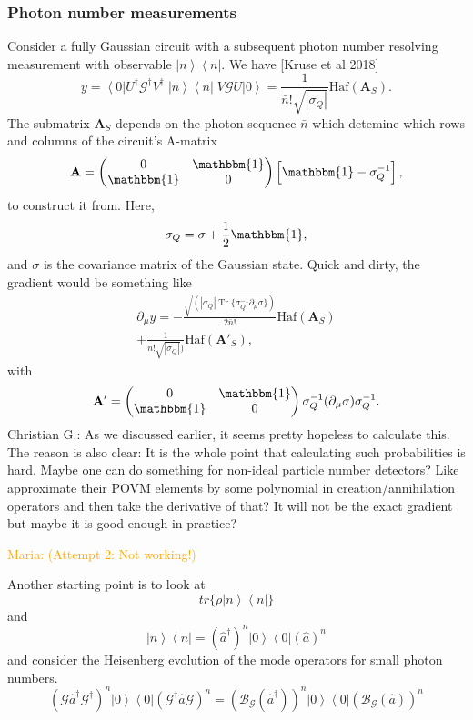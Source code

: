 \documentclass[aps,pra,10pt,twocolumn,groupedaddress,nofootinbib]{revtex4-1}
\theoremstyle{plain}
\DeclareMathOperator{\tr}{Tr}
\newcommand{\ket}[1]{\ensuremath{\left| #1 \right \rangle}}
\newcommand{\bra}[1]{\ensuremath{\left \langle #1 \right |}}
\newcommand{\ketbra}[2]{\ket{#1}\bra{#2}}
\renewcommand{\a}{\hat{a}}
\newcommand{\adag}{\hat{a}^{\dagger}}
\newcommand{\G}{\mathcal{G}}
\newcommand{\maria}[1]{\textcolor{orange}{Maria: #1}}
\newcommand{\cg}[1]{\textcolor{cyan!80!black}{Christian G.: #1}}
\begin{document}
\subsubsection{Photon number measurements}
Consider a fully Gaussian circuit with a subsequent photon number resolving measurement with observable $\ketbra{n}{n}$.  We have [Kruse et al 2018]
\[y = \bra{0}U^{\dagger} \G^{\dagger} V^{\dagger} \; \ketbra{n}{n} \; V \G U \ket{0} =  \frac{1}{\bar{n}! \sqrt{|\sigma_{Q}|} }\text{Haf}(\mathbf{A}_S).\]
The submatrix $\mathbf{A}_S$ depends on the photon sequence $\bar{n}$ which detemine which rows and columns of the circuit's A-matrix
\[ \mathbf{A} =\begin{pmatrix}0 & \mathbbm{1} \\ \mathbbm{1} & 0 \end{pmatrix} \left[ \mathbbm{1} - \sigma_Q^{-1} \right],\]
to construct it from. Here,
\[\sigma_Q = \sigma + \frac{1}{2} \mathbbm{1},\]
and $\sigma$ is the covariance matrix of the Gaussian state.
Quick and dirty, the gradient would be something like
\begin{multline}\partial_{\mu} y = -\frac{\sqrt{(|\sigma_Q| \tr \{ \sigma_Q^{-1} \partial_{\mu} \sigma \})}}{2\bar{n}! }\text{Haf}(\mathbf{A}_S) \\
+ \frac{1}{\bar{n}! \sqrt{|\sigma_{Q}|} )}\text{Haf}(\mathbf{A'}_S),
\end{multline}
with 
\[\mathbf{A}' = \begin{pmatrix}0 & \mathbbm{1} \\ \mathbbm{1} & 0 \end{pmatrix} \sigma_Q^{-1}(\partial_{\mu} \sigma) \sigma_Q^{-1}.\] 
\cg{As we discussed earlier, it seems pretty hopeless to calculate this. The reason is also clear: It is the whole point that calculating such probabilities is hard. Maybe one can do something for non-ideal particle number detectors? Like approximate their POVM elements by some polynomial in creation/annihilation operators and then take the derivative of that? It will not be the exact gradient but maybe it is good enough in practice?}

\maria{(Attempt 2: Not working!)}

Another starting point is to look at 
\[tr \{\rho \ketbra{n}{n}  \} \]
and 
\[\ketbra{n}{n} = (\adag)^n \ketbra{0}{0} (\a)^n \]
and consider the Heisenberg evolution of the mode operators for small photon numbers.
\[ (\G \adag \G^{\dagger})^n \ketbra{0}{0} ( \G^{\dagger} \a \G)^n  = (\mathcal{B}_{\G} (\adag))^n \ketbra{0}{0} (\mathcal{B}_{\G} (\a))^n  \]
\end{document}

